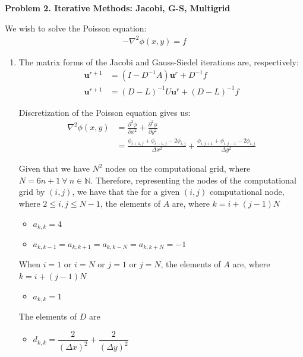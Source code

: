 \textbf{Problem 2.  Iterative Methods: Jacobi, G-S, Multigrid}

We wish to solve the Poisson equation:
\begin{align}
    -\nabla^2\phi(x,y) = f
\end{align}

\begin{enumerate}[label=(\roman*),leftmargin=*,itemsep=0mm]
    
    \item The matrix forms of the Jacobi and Gauss-Siedel iterations are, respectively:
    \begin{align}
        \mathbf{u}^{r+1} &= (I-D^{-1}A)\mathbf{u}^r + D^{-1}f \\
        \mathbf{u}^{r+1} &= (D-L)^{-1}U\mathbf{u}^r + (D-L)^{-1}f
    \end{align}
    
    Discretization of the Poisson equation gives us:
    \begin{align}
        \nabla^2\phi(x,y) &= \frac{\partial^2\phi}{\partial{x^2}} + \frac{\partial^2\phi}{\partial{y^2}} \nonumber \\
        &= \frac{\phi_{i+1,j}+\phi_{i-1,j}-2\phi_{i,j}}{\Delta x^2}
        + \frac{\phi_{i,j+1}+\phi_{i,j-1}-2\phi_{i,j}}{\Delta y^2}
    \end{align}
    
    Given that we have $N^2$ nodes on the computational grid, where $N = 6n + 1 \> \forall \> n\in \mathbb{N}$.  Therefore, representing the nodes of the computational grid by $(i,j)$, we have that the for a given $(i,j)$ computational node, where $2 \leq i,j \leq N-1$, the elements of $A$ are, where $k = i + (j-1)N$
    \begin{itemize}[noitemsep,nolistsep]
        \item $a_{k,k} = 4$
        \item $a_{k,k-1} = a_{k,k+1} = a_{k,k-N} = a_{k,k+N} = -1$
    \end{itemize}
    
    When $i=1$ or $i = N$ or $j = 1$ or $j = N$, the elements of $A$ are, where $k = i + (j-1)N$
    \begin{itemize}[noitemsep,nolistsep]
        \item $a_{k,k} = 1$
    \end{itemize}
    
    The elements of $D$ are
    \begin{itemize}[noitemsep,nolistsep]
        \item $d_{k,k} = \dfrac{2}{(\Delta x)^2} + \dfrac{2}{(\Delta y)^2}$
    \end{itemize}
    

\end{enumerate}
